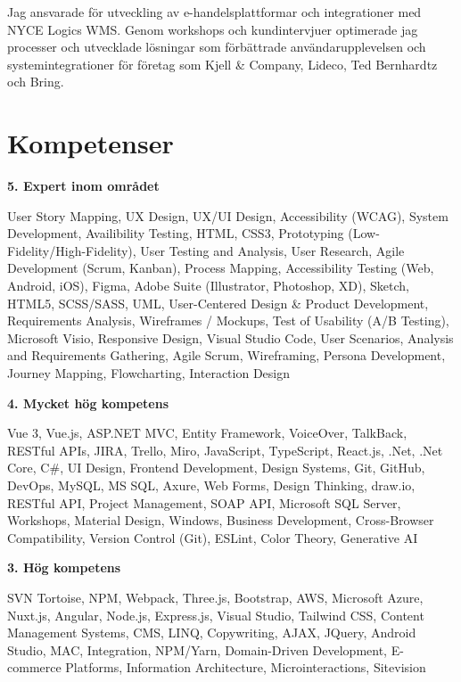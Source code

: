 \documentclass[a4paper,10pt]{article}
\begin{document}
Jag ansvarade för utveckling av e-handelsplattformar och integrationer med NYCE Logics WMS. Genom workshops och kundintervjuer optimerade jag processer och utvecklade lösningar som förbättrade användarupplevelsen och systemintegrationer för företag som Kjell \& Company, Lideco, Ted Bernhardtz och Bring.

\vspace{0.5cm}

\section*{Kompetenser}

\textbf{5. Expert inom området}

User Story Mapping, UX Design, UX/UI Design, Accessibility (WCAG), System Development, Availibility Testing, HTML, CSS3, Prototyping (Low-Fidelity/High-Fidelity), User Testing and Analysis, User Research, Agile Development (Scrum, Kanban), Process Mapping, Accessibility Testing (Web, Android, iOS), Figma, Adobe Suite (Illustrator, Photoshop, XD), Sketch, HTML5, SCSS/SASS, UML, User-Centered Design \& Product Development, Requirements Analysis, Wireframes / Mockups, Test of Usability (A/B Testing), Microsoft Visio, Responsive Design, Visual Studio Code, User Scenarios, Analysis and Requirements Gathering, Agile Scrum, Wireframing, Persona Development, Journey Mapping, Flowcharting, Interaction Design
\vspace{0.3cm}

\textbf{4. Mycket hög kompetens}

Vue 3, Vue.js, ASP.NET MVC, Entity Framework, VoiceOver, TalkBack, RESTful APIs, JIRA, Trello, Miro, JavaScript, TypeScript, React.js, .Net, .Net Core, C\#, UI Design, Frontend Development, Design Systems, Git, GitHub, DevOps, MySQL, MS SQL, Axure, Web Forms, Design Thinking, draw.io, RESTful API, Project Management, SOAP API, Microsoft SQL Server, Workshops, Material Design, Windows, Business Development, Cross-Browser Compatibility, Version Control (Git), ESLint, Color Theory, Generative AI
\vspace{0.5cm}

\textbf{3. Hög kompetens}

SVN Tortoise, NPM, Webpack, Three.js, Bootstrap, AWS, Microsoft Azure, Nuxt.js, Angular, Node.js, Express.js, Visual Studio, Tailwind CSS, Content Management Systems, CMS, LINQ, Copywriting, AJAX, JQuery, Android Studio, MAC, Integration, NPM/Yarn, Domain-Driven Development, E-commerce Platforms, Information Architecture, Microinteractions, Sitevision
\vspace{0.5cm}
\end{document}

